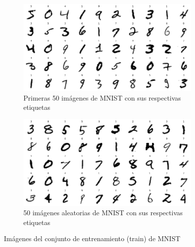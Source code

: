 \begin{figure}[h!]
    \centering
    \begin{subfigure}[b]{0.45\textwidth}
        \centering
        \includegraphics[width=\textwidth]{images/mnist/mnist_train_first50.png}
        \caption{Primeras 50 imágenes de MNIST con sus respectivas etiquetas}
        \label{mnist3}
    \end{subfigure}
    \hspace{1cm}
    \begin{subfigure}[b]{0.45\textwidth}
        \centering
        \includegraphics[width=\textwidth]{images/mnist/mnist_train_random.png}
        \caption{50 imágenes aleatorias de MNIST con sus respectivas etiquetas}
        \label{mnist4}
    \end{subfigure}
    \caption{Imágenes del conjunto de entrenamiento (train) de MNIST}
    \label{mnist_}
\end{figure}

